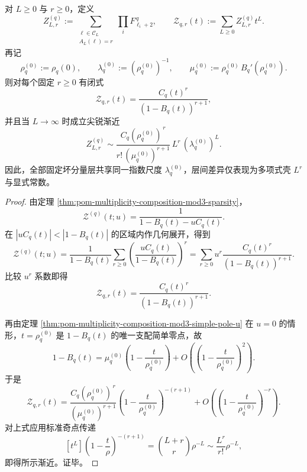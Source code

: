 \begin{theorem}[固定坏分量层的全阶生成函数与统一尖锐主项]\label{thm:conclusion-fixed-bad-component-layer-sharp-main-term}
对 \(L\ge 0\) 与 \(r\ge 0\)，定义
\[
Z_{L,r}^{(q)}
:=
\sum_{\substack{\boldsymbol{\ell}\in\mathcal C_L\\ A_L(\boldsymbol{\ell})=r}}
\prod_i F_{\ell_i+2}^{\,q},
\qquad
\mathcal Z_{q,r}(t):=\sum_{L\ge 0}Z_{L,r}^{(q)}t^L.
\]
再记
\[
\rho_q^{(0)}:=\rho_q(0),
\qquad
\lambda_q^{(0)}:=(\rho_q^{(0)})^{-1},
\qquad
\mu_q^{(0)}:=\rho_q^{(0)}\,B_q'(\rho_q^{(0)}).
\]
则对每个固定 \(r\ge 0\) 有闭式
\[
\mathcal Z_{q,r}(t)=\frac{C_q(t)^r}{(1-B_q(t))^{r+1}},
\]
并且当 \(L\to\infty\) 时成立尖锐渐近
\[
Z_{L,r}^{(q)}
\sim
\frac{C_q(\rho_q^{(0)})^{\,r}}{r!\,(\mu_q^{(0)})^{r+1}}
\,L^r\,(\lambda_q^{(0)})^L.
\]
因此，全部固定坏分量层共享同一指数尺度 \(\lambda_q^{(0)}\)，层间差异仅表现为多项式壳 \(L^r\) 与显式常数。
\end{theorem}
\begin{proof}
由定理 \ref{thm:pom-multiplicity-composition-mod3-sparsity}，
\[
\mathcal Z^{(q)}(t;u)=\frac{1}{1-B_q(t)-uC_q(t)}.
\]
在 \(|uC_q(t)|<|1-B_q(t)|\) 的区域内作几何展开，得到
\[
\mathcal Z^{(q)}(t;u)
=
\frac{1}{1-B_q(t)}
\sum_{r\ge 0}\left(\frac{uC_q(t)}{1-B_q(t)}\right)^r
=
\sum_{r\ge 0}u^r\frac{C_q(t)^r}{(1-B_q(t))^{r+1}}.
\]
比较 \(u^r\) 系数即得
\[
\mathcal Z_{q,r}(t)=\frac{C_q(t)^r}{(1-B_q(t))^{r+1}}.
\]

再由定理 \ref{thm:pom-multiplicity-composition-mod3-simple-pole-u} 在 \(u=0\) 的情形，\(t=\rho_q^{(0)}\) 是 \(1-B_q(t)\) 的唯一支配简单零点，故
\[
1-B_q(t)
=
\mu_q^{(0)}\left(1-\frac{t}{\rho_q^{(0)}}\right)
+ O\!\left(\left(1-\frac{t}{\rho_q^{(0)}}\right)^2\right).
\]
于是
\[
\mathcal Z_{q,r}(t)
=
\frac{C_q(\rho_q^{(0)})^{\,r}}{(\mu_q^{(0)})^{r+1}}
\left(1-\frac{t}{\rho_q^{(0)}}\right)^{-(r+1)}
+ O\!\left(\left(1-\frac{t}{\rho_q^{(0)}}\right)^{-r}\right).
\]
对上式应用标准奇点传递
\[
[t^L]\left(1-\frac{t}{\rho}\right)^{-(r+1)}
=
\binom{L+r}{r}\rho^{-L}
\sim
\frac{L^r}{r!}\rho^{-L},
\]
即得所示渐近。证毕。
\end{proof}

